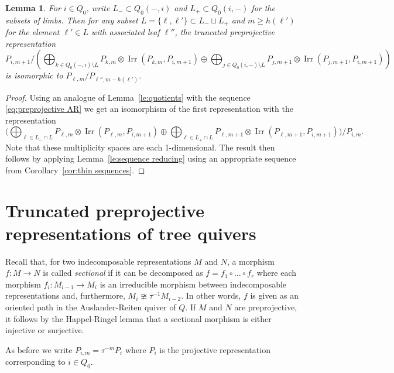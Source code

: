 \documentclass{amsart}
\newtheorem{lemma}[theorem]{Lemma}
\numberwithin{equation}{section}
\newcommand{\Irr}{\operatorname{Irr}}
\begin{document}
\begin{lemma}
  For $i\in Q_0$, write $L_-\subset Q_0(-,i)$ and $L_+\subset Q_0(i,-)$ for the subsets of limbs.
  Then for any subset $L=\{\ell,\ell'\}\subset L_-\sqcup L_+$ and $m\ge h(\ell')$ for the element $\ell'\in L$ with associated leaf $\ell''$, the truncated preprojective representation
  \[
    P_{i,m+1}/\left( \bigoplus_{k\in Q_0(-,i)\setminus L} P_{k,m}\otimes \Irr(P_{k,m},P_{i,m+1}) \oplus \bigoplus_{j\in Q_0(i,-)\setminus L} P_{j,m+1}\otimes \Irr(P_{j,m+1},P_{i,m+1}) \right)
  \]
  is isomorphic to $P_{\ell,m}/P_{\ell'',m-h(\ell')}$.
  \[
  \]
\end{lemma}
\begin{proof}
  Using an analogue of Lemma~\ref{le:quotients} with the sequence \eqref{eq:preprojective AR} we get an isomorphism of the first representation with the representation
  \[
    \Big( \bigoplus_{\ell\in L_-\cap L} P_{\ell,m}\otimes \Irr(P_{\ell,m},P_{i,m+1}) \oplus \bigoplus_{\ell\in L_+\cap L} P_{\ell,m+1}\otimes \Irr(P_{\ell,m+1},P_{i,m+1}) \Big)/P_{i,m}.
  \]
  Note that these multiplicity spaces are each 1-dimensional.
  The result then follows by applying Lemma~\ref{le:sequence reducing} using an appropriate sequence from Corollary~\ref{cor:thin sequences}.
\end{proof}

\section{Truncated preprojective representations of tree quivers}

Recall that, for two indecomposable representations $M$ and $N$, a morphism $f:M\to N$ is called \emph{sectional} if it can be decomposed as $f=f_1\circ\ldots\circ f_r$ where each morphism $f_i:M_{i-1}\to M_i$ is an irreducible morphism between indecomposable representations and, furthermore, $M_i\ncong \tau^{-1}M_{i-2}$. In other words, $f$ is given as an oriented path in the Auslander-Reiten quiver of $Q$. If $M$ and $N$ are preprojective, it follows by the Happel-Ringel lemma that a sectional morphism is either injective or surjective. 

As before we write $P_{i,m}=\tau^{-m}P_i$ where $P_i$ is the projective representation corresponding to $i\in Q_0$.
\end{document}
